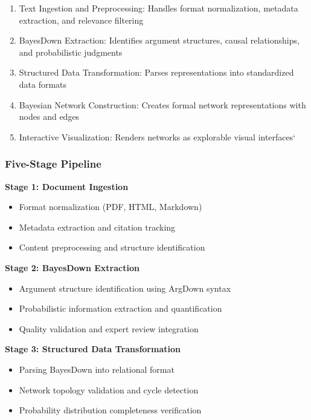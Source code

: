 \documentclass[
  11pt,
  letterpaper,
]{book}
\providecommand{\tightlist}{%
  \setlength{\itemsep}{0pt}\setlength{\parskip}{0pt}}
\begin{document}
\begin{enumerate}
\def\labelenumi{\arabic{enumi}.}
\tightlist
\item
  Text Ingestion and Preprocessing: Handles format normalization,
  metadata extraction, and relevance filtering
\item
  BayesDown Extraction: Identifies argument structures, causal
  relationships, and probabilistic judgments
\item
  Structured Data Transformation: Parses representations into
  standardized data formats
\item
  Bayesian Network Construction: Creates formal network representations
  with nodes and edges
\item
  Interactive Visualization: Renders networks as explorable visual
  interfaces`
\end{enumerate}

\subsubsection{Five-Stage Pipeline}\label{sec-five-stage-pipeline}

\textbf{Stage 1: Document Ingestion}

\begin{itemize}
\tightlist
\item
  Format normalization (PDF, HTML, Markdown)
\item
  Metadata extraction and citation tracking
\item
  Content preprocessing and structure identification
\end{itemize}

\textbf{Stage 2: BayesDown Extraction}

\begin{itemize}
\tightlist
\item
  Argument structure identification using ArgDown syntax
\item
  Probabilistic information extraction and quantification
\item
  Quality validation and expert review integration
\end{itemize}

\textbf{Stage 3: Structured Data Transformation}

\begin{itemize}
\tightlist
\item
  Parsing BayesDown into relational format
\item
  Network topology validation and cycle detection
\item
  Probability distribution completeness verification
\end{itemize}
\end{document}
